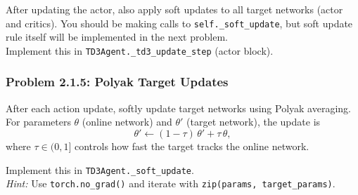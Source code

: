 \documentclass[12pt]{article}
\begin{document}
After updating the actor, also apply soft updates to all target networks (actor and critics). You should be making calls to \texttt{self.\_soft\_update}, but soft update rule itself will be implemented in the next problem.  \\
Implement this in \texttt{TD3Agent.\_td3\_update\_step} (actor block).

\subsubsection*{Problem 2.1.5: Polyak Target Updates}
After each action update, softly update target networks using Polyak averaging. For parameters \(\theta\) (online network) and \(\theta'\) (target network), the update is
\begin{equation}
\theta' \leftarrow (1-\tau)\,\theta' + \tau\,\theta,
\end{equation}
where \(\tau \in (0,1]\) controls how fast the target tracks the online network.  

Implement this in \texttt{TD3Agent.\_soft\_update}.  \\
\textit{Hint:} Use \texttt{torch.no\_grad()} and iterate with \texttt{zip(params, target\_params)}.



\end{document}
